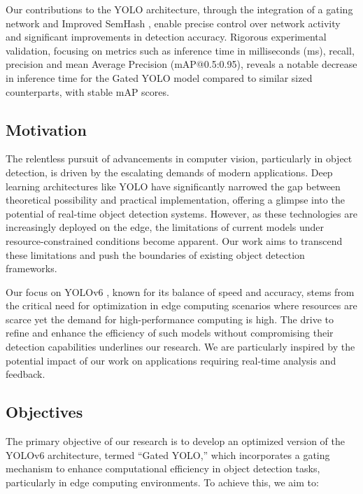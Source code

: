 Our contributions to the YOLO architecture, through the integration of a gating network and Improved SemHash \cite{kaiser2018discrete}, enable precise control over network activity and significant improvements in detection accuracy. Rigorous experimental validation, focusing on metrics such as inference time in milliseconds (ms), recall, precision and mean Average Precision (mAP@0.5:0.95), reveals a notable decrease in inference time for the Gated YOLO model compared to similar sized counterparts, with stable mAP scores.

\subsection{Motivation}

The relentless pursuit of advancements in computer vision, particularly in object detection, is driven by the escalating demands of modern applications. Deep learning architectures like YOLO have significantly narrowed the gap between theoretical possibility and practical implementation, offering a glimpse into the potential of real-time object detection systems. However, as these technologies are increasingly deployed on the edge, the limitations of current models under resource-constrained conditions become apparent. Our work aims to transcend these limitations and push the boundaries of existing object detection frameworks.

Our focus on YOLOv6 \cite{li2022yolov6,li2023yolov6}, known for its balance of speed and accuracy, stems from the critical need for optimization in edge computing scenarios where resources are scarce yet the demand for high-performance computing is high. The drive to refine and enhance the efficiency of such models without compromising their detection capabilities underlines our research. We are particularly inspired by the potential impact of our work on applications requiring real-time analysis and feedback.

\subsection{Objectives}

The primary objective of our research is to develop an optimized version of the YOLOv6 \cite{li2022yolov6,li2023yolov6} architecture, termed ``Gated YOLO,'' which incorporates a gating mechanism to enhance computational efficiency in object detection tasks, particularly in edge computing environments. To achieve this, we aim to:

